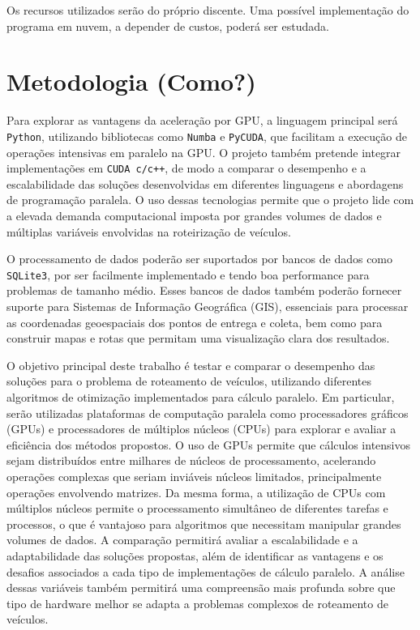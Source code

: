 \documentclass[
    openany,
    12pt,
    a4paper,
    twoside,
    english,
    brazil, sumario=tradicional
]{/home/lucas_galdino/Desktop/TCC/planning/abntex2/abntex2}
\let\oldchapter\chapter
\renewcommand{\chapter}{\clearpage\oldchapter}
\begin{document}
Os recursos utilizados serão do próprio discente. Uma possível implementação do programa em nuvem, a depender de custos, poderá ser estudada.

\chapter{Metodologia (Como?)}

Para explorar as vantagens da aceleração por GPU, a linguagem principal será \verb|Python|, utilizando bibliotecas como \verb|Numba| e \verb|PyCUDA|, que facilitam a execução de operações intensivas em paralelo na GPU\@. O projeto também pretende integrar implementações em \verb|CUDA c/c++|, de modo a comparar o desempenho e a escalabilidade das soluções desenvolvidas em diferentes linguagens e abordagens de programação paralela. O uso dessas tecnologias permite que o projeto lide com a elevada demanda computacional imposta por grandes volumes de dados e múltiplas variáveis envolvidas na roteirização de veículos.

O processamento de dados poderão ser suportados por bancos de dados como \verb|SQLite3|, por ser facilmente implementado e tendo boa performance para problemas de tamanho médio. Esses bancos de dados também poderão fornecer suporte para Sistemas de Informação Geográfica (GIS), essenciais para processar as coordenadas geoespaciais dos pontos de entrega e coleta, bem como para construir mapas e rotas que permitam uma visualização clara dos resultados.

O objetivo principal deste trabalho é testar e comparar o desempenho das soluções para o problema de roteamento de veículos, utilizando diferentes algoritmos de otimização implementados para cálculo paralelo. Em particular, serão utilizadas plataformas de computação paralela como processadores gráficos (GPUs) e processadores de múltiplos núcleos (CPUs) para explorar e avaliar a eficiência dos métodos propostos. O uso de GPUs permite que cálculos intensivos sejam distribuídos entre milhares de núcleos de processamento, acelerando operações complexas que seriam inviáveis núcleos limitados, principalmente operações envolvendo matrizes. Da mesma forma, a utilização de CPUs com múltiplos núcleos permite o processamento simultâneo de diferentes tarefas e processos, o que é vantajoso para algoritmos que necessitam manipular grandes volumes de dados. A comparação permitirá avaliar a escalabilidade e a adaptabilidade das soluções propostas, além de identificar as vantagens e os desafios associados a cada tipo de implementações de cálculo paralelo. A análise dessas variáveis também permitirá uma compreensão mais profunda sobre que tipo de hardware melhor se adapta a problemas complexos de roteamento de veículos.
\end{document}
